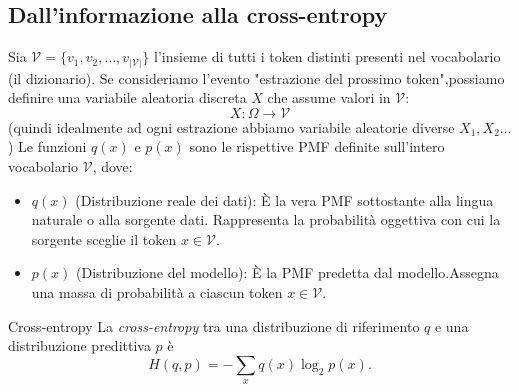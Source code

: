 \subsection{Dall'informazione alla cross-entropy}
Sia $\mathcal{V} = \{v_1, v_2, \dots, v_{\vert{}\mathcal{V}\vert{}}\}$ l'insieme di tutti i token distinti presenti nel vocabolario (il dizionario).
Se consideriamo l'evento "estrazione del prossimo token",possiamo definire una variabile aleatoria discreta $X$ che assume valori in $\mathcal{V}$:$$X: \Omega \to \mathcal{V}$$ (quindi idealmente ad ogni estrazione abbiamo variabile aleatorie diverse $X_1,X_2 \dots$)
Le funzioni $q(x)$ e $p(x)$ sono le rispettive PMF definite sull'intero vocabolario $\mathcal{V}$, dove:
\begin{itemize}
    \item $q(x)$ (Distribuzione reale dei dati): È la vera PMF sottostante alla lingua naturale o alla sorgente dati. Rappresenta la probabilità oggettiva con cui la sorgente sceglie il token $x \in \mathcal{V}$.
    \item $p(x)$ (Distribuzione del modello): È la PMF predetta dal modello.Assegna una massa di probabilità a ciascun token $x \in \mathcal{V}$.
\end{itemize}
\begin{definition}{Cross-entropy}
La \emph{cross-entropy} tra una distribuzione di riferimento $q$ e una distribuzione predittiva $p$ è
\begin{equation}
H(q,p)=-\sum_x q(x)\log_2 p(x).
\end{equation}
\end{definition}

